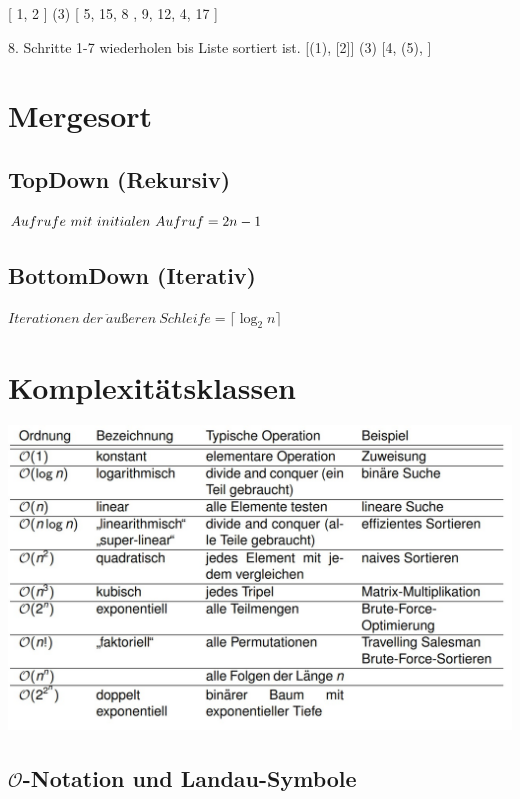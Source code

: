 \documentclass[12pt]{article}
\begin{document}
\begin{center}
	[ 1, 2 ] (3) [ 5, 15, 8 , 9, 12, 4, 17 ]
\end{center}

8. Schritte 1-7 wiederholen bis Liste sortiert ist.
	[(1),  [2]] (3) [4, (5), ]
\newpage

\section{Mergesort}
\subsection{TopDown (Rekursiv)}
\begin{center}
	$Aufrufe \ mit \ initialen \ Aufruf = \Large{2n-1}$
\end{center}

\subsection{BottomDown (Iterativ)}
\begin{center}
	$Iterationen \ der \ \ddot{a}ußeren \ Schleife =  \lceil \log_{2} n \rceil $
\end{center}
\newpage
\section{Komplexitätsklassen}

\includegraphics[scale=0.4]{KK}

\subsection{$\mathcal{O}$-Notation und Landau-Symbole}
\end{document}
